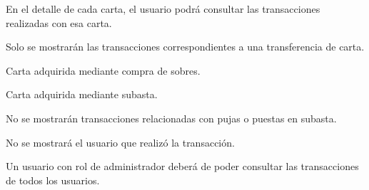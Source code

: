 \begin{RFTransacciones}
	\item En el detalle de cada carta, el usuario podrá consultar las transacciones realizadas con esa carta.
	\begin{RFTransacciones}
		\item Solo se mostrarán las transacciones correspondientes a una transferencia de carta.
		\begin{RFTransacciones}
			\item Carta adquirida mediante compra de sobres.
			\item Carta adquirida mediante subasta.
		\end{RFTransacciones}
		\item No se mostrarán transacciones relacionadas con pujas o puestas en subasta.
		\item No se mostrará el usuario que realizó la transacción.
	\end{RFTransacciones}
	\item Un usuario con rol de administrador deberá de poder consultar las transacciones de todos los usuarios.	
\end{RFTransacciones}